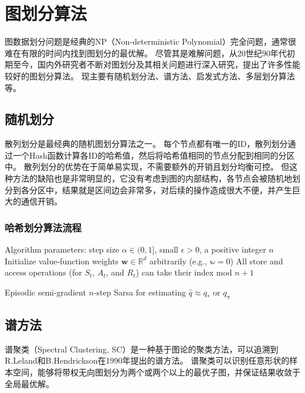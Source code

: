\section{图划分算法}

图数据划分问题是经典的NP（Non-deterministic Polynomial）完全问题，通常很难在有限的时间内找到图划分的最优解。
尽管其是难解问题，从20世纪90年代初期至今，国内外研究者不断对图划分及其相关问题进行深入研究，提出了许多性能较好的图划分算法。
现主要有随机划分法、谱方法、启发式方法、多层划分算法等。

\subsection{随机划分}

散列划分是最经典的随机图划分算法之一。
每个节点都有唯一的ID，散列划分通过一个Hash函数计算各ID的哈希值，然后将哈希值相同的节点分配到相同的分区中。
散列划分的优势在于简单易实现，不需要额外的开销且划分均衡可控。
但这种方法的缺陷也是非常明显的，它没有考虑到图的内部结构，各节点会被随机地划分到各分区中，结果就是区间边会非常多，对后续的操作造成很大不便，并产生巨大的通信开销。

\subsubsection{哈希划分算法流程}

\begin{algorithm}[htbp]
\SetAlgoLined
{}
Algorithm parameters: step size $\alpha \in (0,1]$, small $\epsilon > 0 $, a positive integer $n$\;
Initialize value-function weights $\mathbf{w} \in \mathbb{R}^{d}$ arbitrarily (e.g., $\mathbb{w} = 0$)
All store and access operations (for $S_t$, $A_t$, and $R_t$) can take their index mod $n + 1$ \;

\caption{Episodic semi-gradient $n$-step Sarsa for estimating $\hat{q} \approx q_* $ or $q_\pi$}
\end{algorithm}


\subsection{谱方法}

谱聚类（Spectral Clustering, SC）是一种基于图论的聚类方法，可以追溯到R.Leland和B.Hendrickson在1990年提出的谱方法。
谱聚类可以识别任意形状的样本空间，能够将带权无向图划分为两个或两个以上的最优子图，并保证结果收敛于全局最优解。

